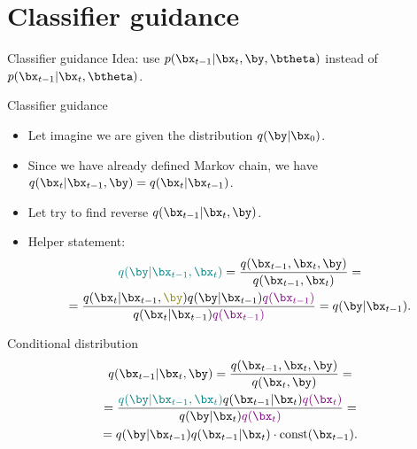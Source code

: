 \section{Classifier guidance}
\begin{frame}{Classifier guidance}
	Idea: use $p(\bx_{t-1} | \bx_t, \by, \btheta)$ instead of $p(\bx_{t-1} | \bx_t, \btheta)$.
\end{frame}
\begin{frame}{Classifier guidance}
	\begin{itemize}
		\item Let imagine we are given the distribution $q(\by | \bx_0)$. 
		\item Since we have already defined Markov chain, we have $q(\bx_t | \bx_{t-1}, \by) = q(\bx_t | \bx_{t - 1})$.
		\item Let try to find reverse $q(\bx_{t-1} | \bx_t, \by)$.
		\item Helper statement:
		\vspace{-0.2cm}
		\begin{multline*}
			{\color{teal}q(\by | \bx_{t - 1}, \bx_t)} = \frac{q(\bx_{t - 1}, \bx_t, \by)}{q(\bx_{t - 1}, \bx_t)} = \\
			= \frac{q(\bx_t | \bx_{t - 1}, {\color{olive}\by}) q(\by | \bx_{t - 1}) \color{violet}{q(\bx_{t - 1})}} {q(\bx_t | \bx_{t - 1}) \color{violet}{q(\bx_{t - 1})}} = q(\by | \bx_{t - 1}).
		\end{multline*}
		\vspace{-0.4cm}
	\end{itemize}
	\begin{block}{Conditional distribution}
		\vspace{-0.7cm}
		\begin{multline*}
			q(\bx_{t - 1} | \bx_t, \by) = \frac{q(\bx_{t - 1}, \bx_t, \by)}{q(\bx_t, \by)}  = \\ 
			=  \frac{{\color{teal}q(\by | \bx_{t - 1}, \bx_t)} q(\bx_{t - 1} | \bx_t) {\color{violet}q(\bx_t)}}{q(\by | \bx_t) {\color{violet}q(\bx_t)}} = \\
			= q(\by | \bx_{t - 1}) q(\bx_{t - 1} | \bx_t) \cdot \text{const}(\bx_{t - 1}).
		\end{multline*}
	\end{block}
\end{frame}
